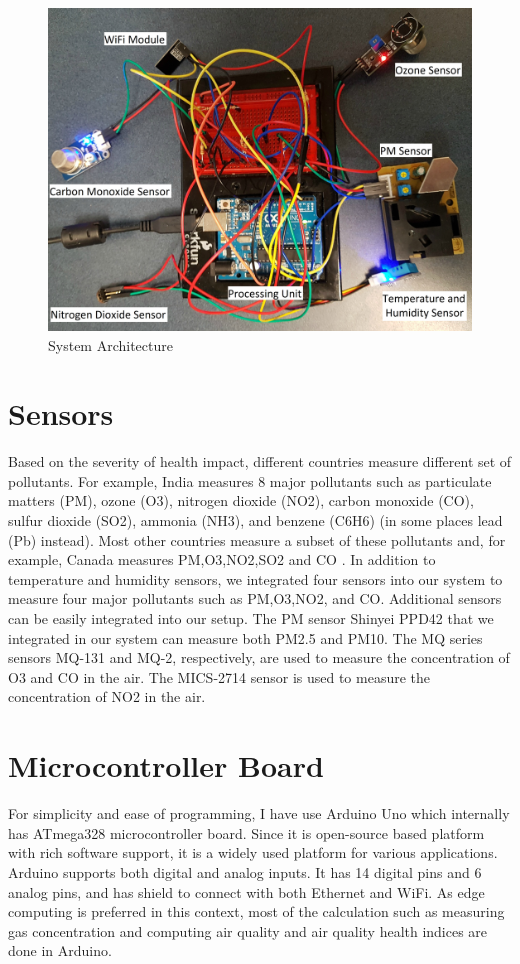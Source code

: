 \documentclass[10pt,a4paper]{report}
\begin{document}
\begin{figure}[h!]
  \centering
  \hspace*{-1.25cm}   
\includegraphics[scale=0.094]{images/fig4.jpg}
  \hspace*{-1.25cm}
  \caption{System Architecture}
  \label{arch}
\end{figure}
\section{Sensors}

Based on the severity of health impact, different countries measure different set of pollutants. For example, India measures 8 major pollutants such as particulate matters (PM), ozone (O3), nitrogen dioxide (NO2), carbon monoxide (CO), sulfur dioxide (SO2), ammonia (NH3), and benzene (C6H6) (in some places lead (Pb) instead). Most other countries measure a subset of these pollutants and, for example, Canada measures PM,O3,NO2,SO2 and CO \cite{HR13}.
 In addition to temperature and humidity sensors, we integrated four sensors into our system to measure four major pollutants such as PM,O3,NO2, and CO. Additional sensors can be easily integrated into our setup. The PM sensor Shinyei PPD42 that we integrated in our system can measure both PM2.5 and PM10. The MQ series sensors MQ-131 and MQ-2, respectively, are used to measure the concentration of O3 and CO in the air. The MICS-2714 sensor is used to measure the concentration of NO2 in the air.
 \section{Microcontroller Board}
 For simplicity and ease of programming, I have use Arduino Uno which internally has ATmega328 microcontroller board. Since it is open-source based platform with rich software support, it is a widely used platform for various applications. Arduino supports both digital and analog inputs. It has 14 digital pins and 6 analog pins, and has shield to connect with both Ethernet and WiFi. As edge computing is preferred in this context, most of the calculation such as measuring gas concentration and computing air quality and air quality health indices are done in Arduino.
\end{document}
